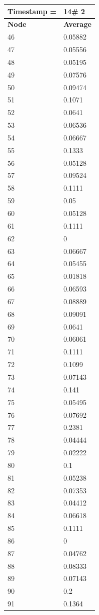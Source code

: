 \begin{tabular}{|l||l|}
\hline
\textbf{Timestamp =} & \textbf{14}\# 2\\\hline
	\textbf{Node} & \textbf{Average} \\ \hline
\hline
	46 & 0.05882 \\ \hline
	47 & 0.05556 \\ \hline
	48 & 0.05195 \\ \hline
	49 & 0.07576 \\ \hline
	50 & 0.09474 \\ \hline
	51 & 0.1071 \\ \hline
	52 & 0.0641 \\ \hline
	53 & 0.06536 \\ \hline
	54 & 0.06667 \\ \hline
	55 & 0.1333 \\ \hline
	56 & 0.05128 \\ \hline
	57 & 0.09524 \\ \hline
	58 & 0.1111 \\ \hline
	59 & 0.05 \\ \hline
	60 & 0.05128 \\ \hline
	61 & 0.1111 \\ \hline
	62 & 0 \\ \hline
	63 & 0.06667 \\ \hline
	64 & 0.05455 \\ \hline
	65 & 0.01818 \\ \hline
	66 & 0.06593 \\ \hline
	67 & 0.08889 \\ \hline
	68 & 0.09091 \\ \hline
	69 & 0.0641 \\ \hline
	70 & 0.06061 \\ \hline
	71 & 0.1111 \\ \hline
	72 & 0.1099 \\ \hline
	73 & 0.07143 \\ \hline
	74 & 0.141 \\ \hline
	75 & 0.05495 \\ \hline
	76 & 0.07692 \\ \hline
	77 & 0.2381 \\ \hline
	78 & 0.04444 \\ \hline
	79 & 0.02222 \\ \hline
	80 & 0.1 \\ \hline
	81 & 0.05238 \\ \hline
	82 & 0.07353 \\ \hline
	83 & 0.04412 \\ \hline
	84 & 0.06618 \\ \hline
	85 & 0.1111 \\ \hline
	86 & 0 \\ \hline
	87 & 0.04762 \\ \hline
	88 & 0.08333 \\ \hline
	89 & 0.07143 \\ \hline
	90 & 0.2 \\ \hline
	91 & 0.1364 \\ \hline
\end{tabular}
